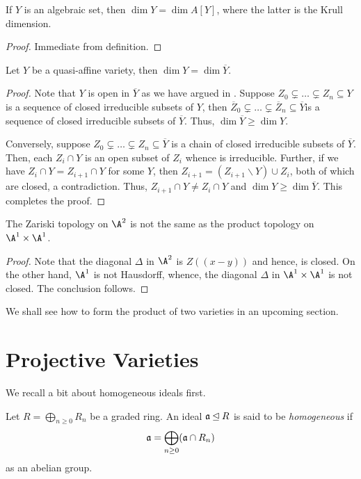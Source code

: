 \begin{proposition}
    If $Y$ is an algebraic set, then $\dim Y = \dim A[Y]$, where the latter is the Krull dimension.
\end{proposition}
\begin{proof}
    Immediate from definition.
\end{proof}

\begin{proposition}
    Let $Y$ be a quasi-affine variety, then $\dim Y = \dim\overline Y$.
\end{proposition}
\begin{proof}
    Note that $Y$ is open in $\overline Y$ as we have argued in . Suppose $Z_0\subsetneq\dots\subsetneq Z_n\subseteq Y$ is a sequence of closed irreducible subsets of $Y$, then $\overline Z_0\subsetneq\dots\subsetneq\overline Z_n\subseteq\overline Y$is a sequence of closed irreducible subsets of $\overline Y$. Thus, $\dim\overline Y\ge\dim Y$.

    Conversely, suppose $Z_0\subsetneq\dots\subsetneq Z_n\subseteq\overline Y$ is a chain of closed irreducible subsets of $\overline Y$. Then, each $Z_i\cap Y$ is an open subset of $Z_i$ whence is irreducible. 
    Further, if we have $Z_i\cap Y = Z_{i + 1}\cap Y$ for some $Y$, then $Z_{i  + 1} = (Z_{i + 1}\backslash Y)\cup Z_i$, both of which are closed, a contradiction. Thus, $Z_{i + 1}\cap Y\ne Z_i\cap Y$ and $\dim Y\ge\dim\overline Y$. This completes the proof.
\end{proof}

\begin{proposition}
    The Zariski topology on $\A^2$ is not the same as the product topology on $\A^1\times\A^1$.
\end{proposition}
\begin{proof}
    Note that the diagonal $\Delta$ in $\A^2$ is $Z((x - y))$ and hence, is closed. On the other hand, $\A^1$ is not Hausdorff, whence, the diagonal $\Delta$ in $\A^1\times\A^1$ is not closed. The conclusion follows.
\end{proof}
We shall see how to form the product of two varieties in an upcoming section.

\section{Projective Varieties}

We recall a bit about homogeneous ideals first.

\begin{definition}
    Let $R = \bigoplus_{n\ge 0} R_n$ be a graded ring. An ideal $\mathfrak a\unlhd R$ is said to be \emph{homogeneous} if 
    \begin{equation*}
        \mathfrak a = \bigoplus_{n\ge 0}(\mathfrak a\cap R_n)
    \end{equation*}
    as an abelian group.
\end{definition}


